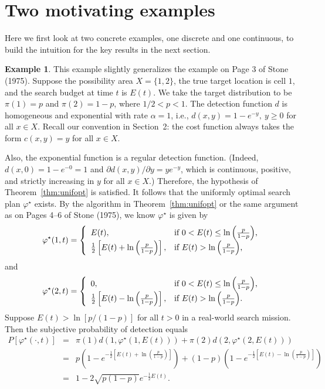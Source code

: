 \documentclass[12pt]{article}
\theoremstyle{plain}
\theoremstyle{definition}
\newtheorem{example}{Example}%
\theoremstyle{remark}
\begin{document}
%
\section{Two motivating examples}
Here we first look at two concrete examples,  one discrete and one continuous, to build the intuition for the key results in the next section.

\begin{example}
\label{ex:discrete1}
This example slightly generalizes the example on Page 3 of Stone (1975). Suppose the possibility area $X=\{1, 2\}$, the true target location is cell $1$,  and the search budget at time $t$ is $E(t)$.   We take the target distribution to be $\pi(1)=p$ and $\pi(2)=1-p$, where $1/2<p<1$.  The detection function $d$  is homogeneous and exponential with rate $\alpha=1$, i.e.,  $d(x, y)=1-e^{-y}, \ y\geq 0$ for all $x\in X$.  Recall our convention in Section~2: the cost function always takes the form $c(x, y)=y$ for all $x\in X$.  

Also, the exponential function is a regular detection function.  (Indeed, $d(x, 0)=1-e^{-0}=1$ and $\partial d(x, y)/ \partial y=ye^{-y}$, which is continuous, positive, and strictly increasing in $y$ for all $x\in X$.) Therefore,  the hypothesis of Theorem~\ref{thm:unifopt} is satisfied.  It follows that the uniformly optimal search plan $\varphi^\star$ exists.   By the algorithm in Theorem~\ref{thm:unifopt} or the same argument as on Pages 4--6 of Stone (1975),  we know $\varphi^\star$ is given by 
\[\varphi^\star (1, t)=\left\{
		                           \begin{array}{ll}
		                            E(t),  & \hbox{if $0<E(t)\leq  \ln \left(\frac{p}{1-p}\right) $,} \\
					 \frac{1}{2}\left[E(t)+\ln \left(\frac{p}{1-p}\right) \right],  & \hbox{if $E(t)>\ln \left(\frac{p}{1-p}\right) $,} 
		                          \end{array}
		                         \right.
		                         \]
and 
\[\varphi^\star (2, t)=\left\{
		                           \begin{array}{ll}
		                          0,  & \hbox{if $0< E(t) \leq \ln \left(\frac{p}{1-p}\right) $,} \\
					 \frac{1}{2}\left[E(t)-\ln \left(\frac{p}{1-p}\right) \right],  & \hbox{if $E(t)>\ln \left(\frac{p}{1-p}\right)$.} 
		                          \end{array}
		                         \right.
		                         \]
Suppose $E(t)>\ln [p/(1-p)]$ for all $t>0$ in a real-world search mission. Then the subjective probability of detection equals
\begin{eqnarray*}
P[\varphi^\star(\cdot, t)] &=& \pi(1) d(1,  \varphi^\star (1, E(t)))+\pi(2)d(2, \varphi^\star (2, E(t)))\\
			&=& p\left(1-e^{- \frac{1}{2}\left[E(t)+\ln \left(\frac{p}{1-p}\right) \right]}\right)+(1-p)\left(1-e^{- \frac{1}{2}\left[E(t)-\ln \left(\frac{p}{1-p}\right) \right]}\right) \\
			&=& 1-2\sqrt{p(1-p)}e^{-\frac{1}{2}E(t)}.
\end{eqnarray*}



\end{example}
\end{document}
